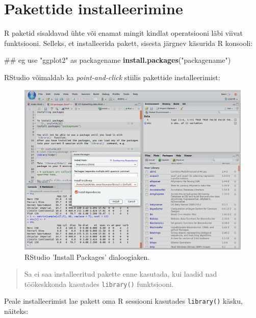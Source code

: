 \documentclass[]{book}
\newenvironment{Shaded}{\begin{snugshade}}{\end{snugshade}}
\newcommand{\KeywordTok}[1]{\textcolor[rgb]{0.13,0.29,0.53}{\textbf{#1}}}
\newcommand{\StringTok}[1]{\textcolor[rgb]{0.31,0.60,0.02}{#1}}
\newcommand{\NormalTok}[1]{#1}
\begin{document}
\chapter{Pakettide installeerimine}\label{pakettide-installeerimine}

R paketid sisaldavad ühte või enamat mingit kindlat operatsiooni läbi
viivat funktsiooni. Selleks, et installeerida pakett, sisesta järgnev
käsurida R konsooli:

\begin{Shaded}
\begin{Highlighting}[]
\NormalTok{## eg use "ggplot2" as packagename}
\KeywordTok{install.packages}\NormalTok{(}\StringTok{"packagename"}\NormalTok{)}
\end{Highlighting}
\end{Shaded}

RStudio võimaldab ka \emph{point-and-click} stiilis pakettide
installeerimist:

\begin{figure}
\includegraphics[width=16.85in]{assets/img/RStudio_package.install} \caption{RStudio 'Install Packages' dialoogiaken.}\label{fig:unnamed-chunk-2}
\end{figure}

\begin{quote}
Sa ei saa installeeritud pakette enne kasutada, kui laadid nad
töökeskkonda kasutades \texttt{library()} funktsiooni.
\end{quote}

Peale installeerimist lae pakett oma R sessiooni kasutades
\texttt{library()} käsku, näiteks:
\end{document}
